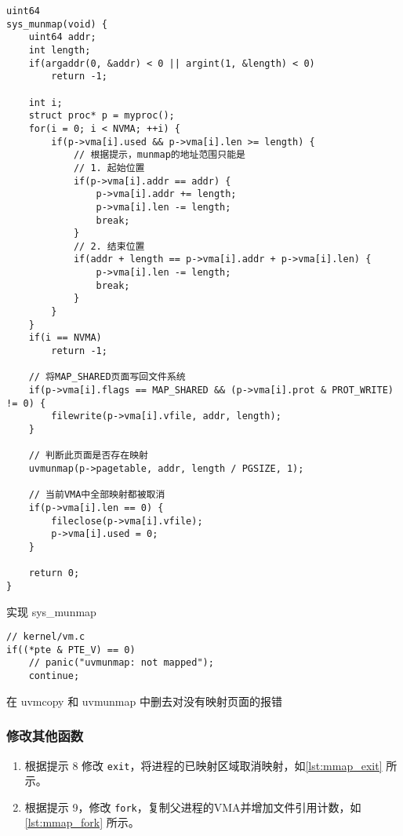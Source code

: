 \begin{listing}[!htb]
	\begin{verbatim}
uint64
sys_munmap(void) {
    uint64 addr;
    int length;
    if(argaddr(0, &addr) < 0 || argint(1, &length) < 0)
        return -1;

    int i;
    struct proc* p = myproc();
    for(i = 0; i < NVMA; ++i) {
        if(p->vma[i].used && p->vma[i].len >= length) {
            // 根据提示，munmap的地址范围只能是
            // 1. 起始位置
            if(p->vma[i].addr == addr) {
                p->vma[i].addr += length;
                p->vma[i].len -= length;
                break;
            }
            // 2. 结束位置
            if(addr + length == p->vma[i].addr + p->vma[i].len) {
                p->vma[i].len -= length;
                break;
            }
        }
    }
    if(i == NVMA)
        return -1;

    // 将MAP_SHARED页面写回文件系统
    if(p->vma[i].flags == MAP_SHARED && (p->vma[i].prot & PROT_WRITE) != 0) {
        filewrite(p->vma[i].vfile, addr, length);
    }

    // 判断此页面是否存在映射
    uvmunmap(p->pagetable, addr, length / PGSIZE, 1);
    
    // 当前VMA中全部映射都被取消
    if(p->vma[i].len == 0) {
        fileclose(p->vma[i].vfile);
        p->vma[i].used = 0;
    }

    return 0;
}
	\end{verbatim}
	\caption{实现 sys\_munmap}\label{lst:sys_munmap}
\end{listing}

\begin{listing}[!htb]
	\begin{verbatim}
// kernel/vm.c
if((*pte & PTE_V) == 0)
    // panic("uvmunmap: not mapped");
    continue;

	\end{verbatim}
	\caption{在 uvmcopy 和 uvmunmap 中删去对没有映射页面的报错}\label{lst:uvmcopy_and_uvmunmap}
\end{listing}

\subsubsection{修改其他函数}

\begin{enumerate}
	\item 根据提示 8 修改 \texttt{exit}，将进程的已映射区域取消映射，如\cref{lst:mmap_exit} 所示。
	\item 根据提示 9，修改 \texttt{fork}，复制父进程的VMA并增加文件引用计数，如\cref{lst:mmap_fork} 所示。
\end{enumerate}

